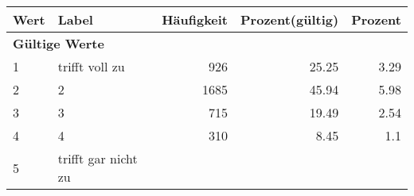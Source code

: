      \begin{longtable}{lXrrr}
     \toprule
     \textbf{Wert} & \textbf{Label} & \textbf{Häufigkeit} & \textbf{Prozent(gültig)} & \textbf{Prozent} \\
     \endhead
     \midrule
     \multicolumn{5}{l}{\textbf{Gültige Werte}}\\

     1 &
     \multicolumn{1}{X}{ trifft voll zu   } &


       \num{926} &
       \num[round-mode=places,round-precision=2]{25.25} &
         \num[round-mode=places,round-precision=2]{3.29} \\

     2 &
     \multicolumn{1}{X}{ 2   } &


       \num{1685} &
       \num[round-mode=places,round-precision=2]{45.94} &
         \num[round-mode=places,round-precision=2]{5.98} \\

     3 &
     \multicolumn{1}{X}{ 3   } &


       \num{715} &
       \num[round-mode=places,round-precision=2]{19.49} &
         \num[round-mode=places,round-precision=2]{2.54} \\

     4 &
     \multicolumn{1}{X}{ 4   } &


       \num{310} &
       \num[round-mode=places,round-precision=2]{8.45} &
         \num[round-mode=places,round-precision=2]{1.1} \\

     5 &
     \multicolumn{1}{X}{ trifft gar nicht zu   } &



\end{longtable}
